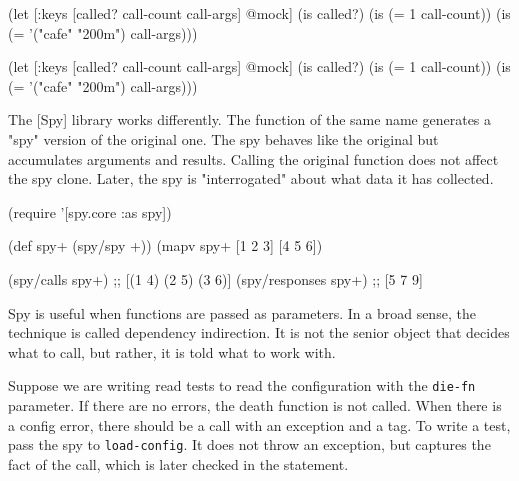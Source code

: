 \ifx\DEVICETYPE\MOBILE

\begin{english}
  \begin{clojure}
(let [{:keys [called?
              call-count
              call-args]} @mock]
  (is called?)
  (is (= 1 call-count))
  (is (= '("cafe" "200m") call-args)))
  \end{clojure}
\end{english}

\else

\begin{english}
  \begin{clojure}
(let [{:keys [called? call-count call-args]} @mock]
  (is called?)
  (is (= 1 call-count))
  (is (= '("cafe" "200m") call-args)))
  \end{clojure}
\end{english}

\fi


The [Spy] library works differently. The function of the same name generates a "spy" version of the original one. The spy behaves like the original but accumulates arguments and results. Calling the original function does not affect the spy clone. Later, the spy is "interrogated" about what data it has collected.

\begin{english}
  \begin{clojure}
(require '[spy.core :as spy])

(def spy+ (spy/spy +))
(mapv spy+ [1 2 3] [4 5 6])

(spy/calls spy+)
;; [(1 4) (2 5) (3 6)]
(spy/responses spy+)
;; [5 7 9]
  \end{clojure}
\end{english}



Spy is useful when functions are passed as parameters. In a broad sense, the technique is called dependency indirection. It is not the senior object that decides what to call, but rather, it is told what to work with.

Suppose we are writing read tests to read the configuration with the \verb|die-fn| parameter. If there are no errors, the death function is not called. When there is a config error, there should be a call with an exception and a tag. To write a test, pass the spy to \verb|load-config|. It does not throw an exception, but captures the fact of the call, which is later checked in the statement.

